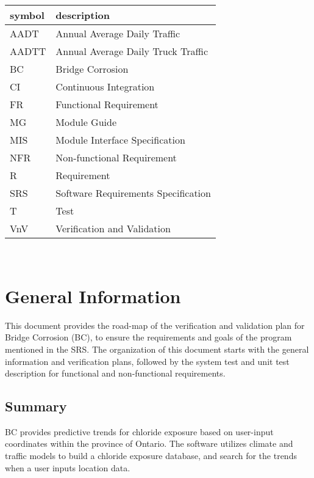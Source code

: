 \documentclass[12pt, titlepage]{article}
\begin{document}
\renewcommand{\arraystretch}{1.2}
\begin{tabular}{l l} 
  \toprule		
  \textbf{symbol} & \textbf{description}\\
  \midrule 

  AADT & Annual Average Daily Traffic\\
  AADTT & Annual Average Daily Truck Traffic \\
  BC & Bridge Corrosion\\
  CI & Continuous Integration\\
  FR & Functional Requirement\\
  MG & Module Guide\\
  MIS & Module Interface Specification\\
  NFR & Non-functional Requirement\\
  R & Requirement\\
  SRS & Software Requirements Specification\\
  T & Test\\
  VnV & Verification and Validation\\
  
  \bottomrule
\end{tabular}\\



\newpage


\section{General Information}

This document provides the road-map of the verification and validation plan for Bridge Corrosion (BC), to ensure the requirements and goals of the program mentioned in the SRS. The organization of this document starts with the general information and verification plans, followed by the system test and unit test description for functional and non-functional requirements. 

\subsection{Summary}

BC provides predictive trends for chloride exposure based on user-input coordinates within the province of Ontario. The software utilizes climate and traffic models to build a chloride exposure database, and search for the trends when a user inputs location data.
\end{document}
